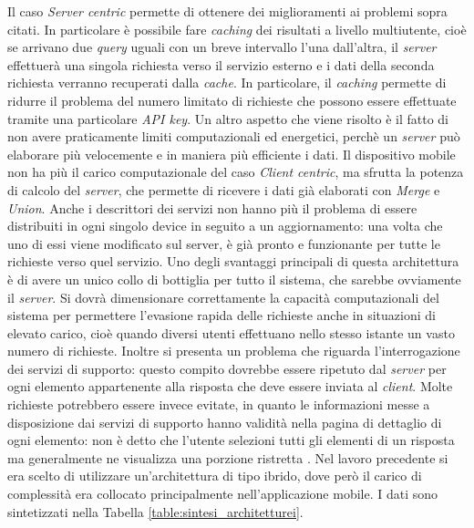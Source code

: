Il caso \emph{Server centric} permette di ottenere dei miglioramenti ai problemi sopra citati. In particolare è possibile fare \emph{caching} dei risultati a livello multiutente, cioè se arrivano due \emph{query} uguali con un breve intervallo l'una dall'altra, il \emph{server} effettuerà una singola richiesta verso il servizio esterno e i dati della seconda richiesta verranno recuperati dalla \emph{cache}. In particolare, il \emph{caching} permette di ridurre il problema del numero limitato di richieste che possono essere effettuate tramite una particolare \emph{API key}. Un altro aspetto che viene risolto è il fatto di non avere praticamente limiti computazionali ed energetici, perchè un \emph{server} può elaborare più velocemente e in maniera più efficiente i dati. Il dispositivo mobile non ha più il carico computazionale del caso \emph{Client centric}, ma sfrutta la potenza di calcolo del \emph{server}, che permette di ricevere i dati già elaborati con \emph{Merge} e \emph{Union}. Anche i descrittori dei servizi non hanno più il problema di essere distribuiti in ogni singolo device in seguito a un aggiornamento: una volta che uno di essi viene modificato sul server, è già pronto e funzionante per tutte le richieste verso quel servizio.
Uno degli svantaggi principali di questa architettura è di avere un unico collo di bottiglia per tutto il sistema, che sarebbe ovviamente il \emph{server}. Si dovrà dimensionare correttamente la capacità computazionali del sistema per permettere l'evasione rapida delle richieste anche in situazioni di elevato carico, cioè quando diversi utenti effettuano nello stesso istante un vasto numero di richieste. Inoltre si presenta un problema che riguarda l'interrogazione dei servizi di supporto: questo compito dovrebbe essere ripetuto dal \emph{server} per ogni elemento appartenente alla risposta che deve essere inviata al \emph{client}. Molte richieste potrebbero essere invece evitate, in quanto le informazioni messe a disposizione dai servizi di supporto hanno validità nella pagina di dettaglio di ogni elemento: non è detto che l'utente selezioni tutti gli elementi di un risposta ma generalmente ne visualizza una porzione ristretta \cite{van2009using}. Nel lavoro precedente \cite{rizzo2015progettazione} si era scelto di utilizzare un'architettura di tipo ibrido, dove però il carico di complessità era collocato principalmente nell'applicazione mobile.
I dati sono sintetizzati nella Tabella \ref{table:sintesi_architetturei}.

